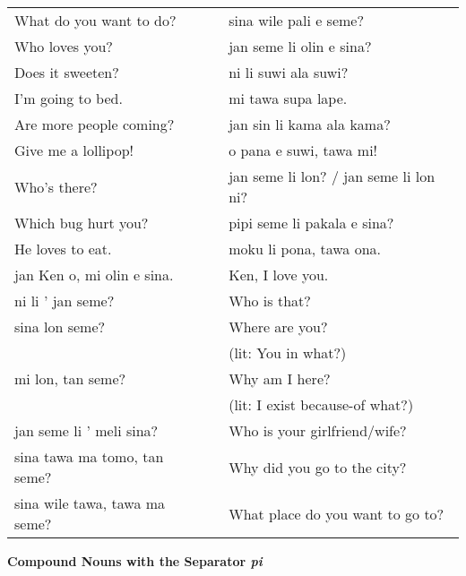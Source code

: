 \begin{supertabular}{p{5,5cm}|ll}
What do you want to do?  && sina wile pali e seme? \\ %
Who loves you?  && jan seme li olin e sina? \\ %
Does it sweeten? && ni li suwi ala suwi? \\ %
I'm going to bed.  && mi tawa supa lape. \\ %
Are more people coming?  && jan sin li kama ala kama? \\ %
Give me a lollipop!  && o pana e suwi, tawa mi! \\ %
Who's there?  && jan seme li lon? / jan seme li lon ni? \\ %
Which bug hurt you?  && pipi seme li pakala e sina? \\ %
He loves to eat.  && moku li pona, tawa ona. \\ %
jan Ken o, mi olin e sina.  && Ken, I love you. \\
ni li ' jan seme?  && Who is that? \\
sina lon seme?  && Where are you? \\ 
                &&   (lit: You in what?) \\ %
mi lon, tan seme?  && Why am I here? \\ 
                &&   (lit: I exist because-of what?) \\ %
jan seme li ' meli sina?  && Who is your girlfriend/wife? \\
sina tawa ma tomo, tan seme?  && Why did you go to the city? \\
sina wile tawa, tawa ma seme?  && What place do you want to go to? \\
\end{supertabular} 

\textbf{Compound Nouns with the Separator \textit{pi}} 
\label{'pi'}

